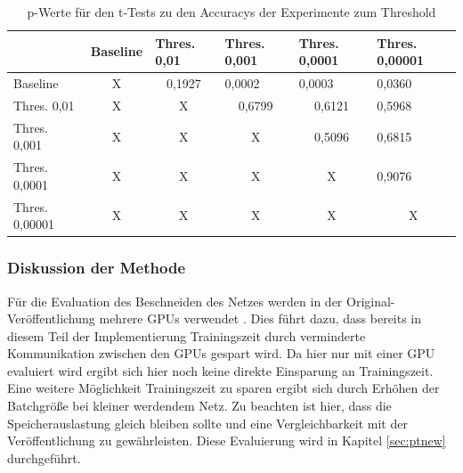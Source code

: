  \begin{table}[]
\caption{p-Werte für den t-Tests zu den Accuracys der Experimente zum Threshold}
\begin{tabular}{l|c|c|c|c|l|}
\cline{2-6}
                                     & \multicolumn{1}{l|}{Baseline} & \multicolumn{1}{l|}{Thres. 0,01} & \multicolumn{1}{l|}{Thres. 0,001} & \multicolumn{1}{l|}{Thres. 0,0001} & Thres. 0,00001                 \\ \hline
\multicolumn{1}{|l|}{Baseline}       & X                             & 0,1927                           & \multicolumn{1}{l|}{0,0002}       & \multicolumn{1}{l|}{0,0003}        & 0,0360                         \\ \hline
\multicolumn{1}{|l|}{Thres. 0,01}    & X                             & X                                & \cellcolor[HTML]{FE0000}0,6799    & \cellcolor[HTML]{FE0000}0,6121     & \cellcolor[HTML]{FE0000}0,5968 \\ \hline
\multicolumn{1}{|l|}{Thres. 0,001}   & X                             & X                                & X                                 & \cellcolor[HTML]{FE0000}0,5096     & \cellcolor[HTML]{FE0000}0,6815 \\ \hline
\multicolumn{1}{|l|}{Thres. 0,0001}  & X                             & X                                & X                                 & X                                  & \cellcolor[HTML]{FE0000}0,9076 \\ \hline
\multicolumn{1}{|l|}{Thres. 0,00001} & X                             & X                                & X                                 & X                                  & \multicolumn{1}{c|}{X}         \\ \hline
\end{tabular}
\label{tab:thres2}
\end{table}
\subsubsection{Diskussion der Methode}

Für die Evaluation des Beschneiden des Netzes werden in der Original-Veröffentlichung mehrere GPUs verwendet \cite{prunetrain}. Dies führt dazu, dass bereits in diesem Teil der Implementierung Trainingszeit durch verminderte Kommunikation zwischen den GPUs gespart wird. Da hier nur mit einer GPU evaluiert wird ergibt sich hier noch keine direkte Einsparung an Trainingszeit. Eine weitere Möglichkeit Trainingszeit zu sparen ergibt sich durch Erhöhen der Batchgröße bei kleiner werdendem Netz. Zu beachten ist hier, dass die Speicherauslastung gleich bleiben sollte und eine Vergleichbarkeit mit der Veröffentlichung zu gewährleisten. Diese Evaluierung wird in Kapitel \ref{sec:ptnew} durchgeführt.


